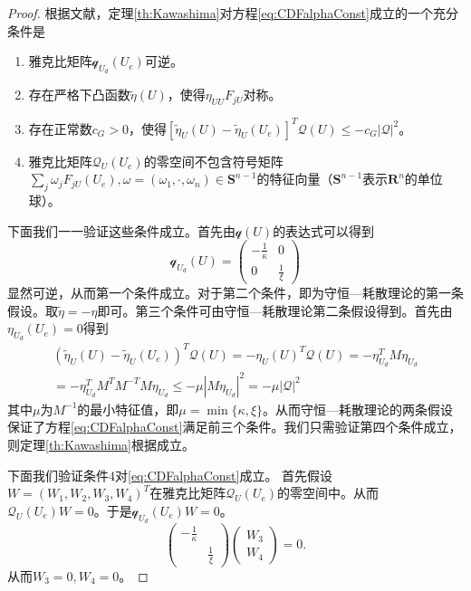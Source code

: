 	\begin{proof}
		根据文献\cite{yong2004entropy}，定理\ref{th:Kawashima}对方程\eqref{eq:CDFalphaConst}成立的一个充分条件是
		\begin{enumerate}
			\item 雅克比矩阵$\mathcal{q}_{U_d}(U_e)$可逆。
			\item 存在严格下凸函数$\tilde{\eta}(U)$，使得$\eta_{UU}F_{jU}$对称。
			\item 存在正常数$c_G >0$，使得$[\tilde{\eta}_{U}(U) - \tilde{\eta}_{U}(U_e)]^T \mathcal{Q}(U) \le - c_G |\mathcal{Q}|^2$。
			\item 雅克比矩阵$\mathcal{Q}_U(U_e)$的零空间不包含符号矩阵$\sum_{j} \omega_j F_{jU}(U_e), \omega =(\omega_1, \cdot,\omega_n) \in \mathbf{S}^{n-1}$的特征向量（$\mathbf{S}^{n-1}$表示$\mathbf{R}^n$的单位球）。
		\end{enumerate}

		下面我们一一验证这些条件成立。首先由$\mathcal{q}(U)$的表达式可以得到
		\begin{equation*}
			\mathcal{q}_{U_d}(U) = \left( \begin{array}{cc} 
				-\frac{1}{\kappa} & 0 \\
				0 & \frac{1}{\xi}
			\end{array}\right)
		\end{equation*}
		显然可逆，从而第一个条件成立。对于第二个条件，即为守恒—耗散理论的第一条假设。取$\tilde{\eta} = -\eta$即可。第三个条件可由守恒—耗散理论第二条假设得到。首先由$\eta_{U_d}(U_e) = 0$得到
		\begin{eqnarray*}
			(\tilde{\eta}_{U}(U) - \tilde{\eta}_{U}(U_e))^T \mathcal{Q}(U) = -\eta_{U}(U)^T  \mathcal{Q}(U) = -\eta_{U_d}^T M \eta_{U_d} \\
			= -\eta_{U_d}^T M^T M^{-T} M \eta_{U_d} \le -\mu |M\eta_{U_d}|^2 = - \mu |\mathcal{Q}|^2 
		\end{eqnarray*}
	其中$\mu$为$M^{-1}$的最小特征值，即$\mu= \min\{\kappa, \xi\}$。从而守恒—耗散理论的两条假设保证了方程\eqref{eq:CDFalphaConst}满足前三个条件。我们只需验证第四个条件成立，则定理\eqref{th:Kawashima}根据\cite{yong2004entropy}成立。

	下面我们验证条件4对\eqref{eq:CDFalphaConst}成立。
	首先假设$W = (W_1,W_2,W_3,W_4)^T$在雅克比矩阵$\mathcal{Q}_U(U_e)$的零空间中。从而$\mathcal{Q}_U(U_e) W = 0$。于是$\mathcal{q}_{U_d}(U_e) W=0$。
	\begin{equation*}
		\left( \begin{array}{cc} 
		-\frac{1}{\kappa} & \\
		&　\frac{1}{\xi} 
		\end{array} \right) 
		\left( \begin{array}{c} W_3 \\W_4 \end{array} \right) = 0.
	\end{equation*}
	从而$W_3=0,W_4=0$。


\end{proof}
